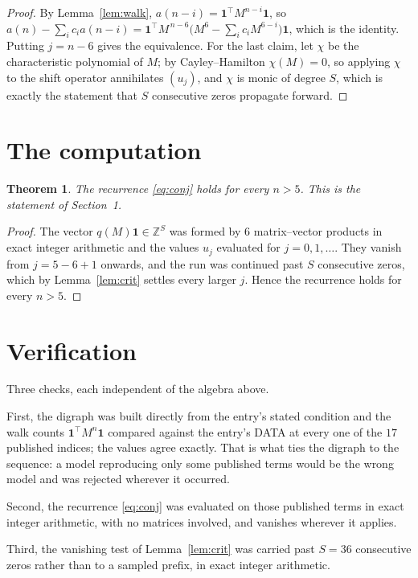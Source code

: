 \documentclass[11pt,a4paper]{article}
\theoremstyle{plain}
\newtheorem{theorem}{Theorem}
\theoremstyle{definition}
\begin{document}
\begin{proof}
By Lemma~\ref{lem:walk}, $a(n-i)=\mathbf{1}^{\!\top}M^{n-i}\mathbf{1}$, so
$a(n)-\sum_i c_i a(n-i)
=\mathbf{1}^{\!\top}M^{\,n-6}\bigl(M^{6}-\sum_i c_i M^{6-i}\bigr)
\mathbf{1}$, which is the identity. Putting $j=n-6$ gives the equivalence. For the
last claim, let $\chi$ be the characteristic polynomial of $M$; by Cayley--Hamilton
$\chi(M)=0$, so applying $\chi$ to the shift operator annihilates $(u_j)$, and $\chi$ is
monic of degree $S$, which is exactly the statement that $S$ consecutive zeros propagate
forward.
\end{proof}

\section{The computation}

\begin{theorem}
The recurrence \eqref{eq:conj} holds for every $n>5$. This is the statement of
Section~1.
\end{theorem}

\begin{proof}
The vector $q(M)\mathbf{1}\in\mathbb{Z}^{S}$ was formed by $6$ matrix--vector
products in exact integer arithmetic and the values $u_j$ evaluated for
$j=0,1,\dots$. They vanish from $j=5-6+1$ onwards, and the run was continued past
$S$ consecutive zeros, which by Lemma~\ref{lem:crit} settles every larger $j$. Hence the
recurrence holds for every $n>5$.
\end{proof}

\section{Verification}

Three checks, each independent of the algebra above.

First, the digraph was built directly from the entry's stated condition and the walk counts
$\mathbf{1}^{\!\top}M^{n}\mathbf{1}$ compared against the entry's DATA at every one of
the $17$ published indices; the values agree exactly. That is what ties the digraph to
the sequence: a model reproducing only some published terms would be the wrong model and
was rejected wherever it occurred.

Second, the recurrence \eqref{eq:conj} was evaluated on those published terms in exact
integer arithmetic, with no matrices involved, and vanishes wherever it applies.

Third, the vanishing test of Lemma~\ref{lem:crit} was carried past $S=36$ consecutive
zeros rather than to a sampled prefix, in exact integer arithmetic.
\end{document}
